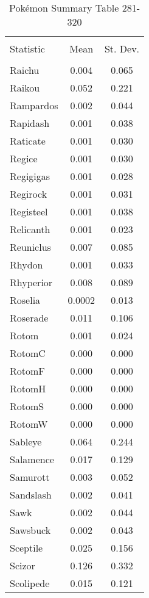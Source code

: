 \documentclass[12pt,twoside]{reedthesis}
\begin{document}
  \begin{table}[!htbp] \centering 
    \caption{Pokémon Summary Table 281-320} 
    \label{} 
  \begin{tabular}{@{\extracolsep{5pt}}lcc} 
  \\[-1.8ex]\hline 
  \hline \\[-1.8ex] 
  Statistic & \multicolumn{1}{c}{Mean} & \multicolumn{1}{c}{St. Dev.} \\ 
  \hline \\[-1.8ex] 
  Raichu & 0.004 & 0.065 \\ 
  Raikou & 0.052 & 0.221 \\ 
  Rampardos & 0.002 & 0.044 \\ 
  Rapidash & 0.001 & 0.038 \\ 
  Raticate & 0.001 & 0.030 \\ 
  Regice & 0.001 & 0.030 \\ 
  Regigigas & 0.001 & 0.028 \\ 
  Regirock & 0.001 & 0.031 \\ 
  Registeel & 0.001 & 0.038 \\ 
  Relicanth & 0.001 & 0.023 \\ 
  Reuniclus & 0.007 & 0.085 \\ 
  Rhydon & 0.001 & 0.033 \\ 
  Rhyperior & 0.008 & 0.089 \\ 
  Roselia & 0.0002 & 0.013 \\ 
  Roserade & 0.011 & 0.106 \\ 
  Rotom & 0.001 & 0.024 \\ 
  RotomC & 0.000 & 0.000 \\ 
  RotomF & 0.000 & 0.000 \\ 
  RotomH & 0.000 & 0.000 \\ 
  RotomS & 0.000 & 0.000 \\ 
  RotomW & 0.000 & 0.000 \\ 
  Sableye & 0.064 & 0.244 \\ 
  Salamence & 0.017 & 0.129 \\ 
  Samurott & 0.003 & 0.052 \\ 
  Sandslash & 0.002 & 0.041 \\ 
  Sawk & 0.002 & 0.044 \\ 
  Sawsbuck & 0.002 & 0.043 \\ 
  Sceptile & 0.025 & 0.156 \\ 
  Scizor & 0.126 & 0.332 \\ 
  Scolipede & 0.015 & 0.121 \\ 

\end{tabular}
\end{table}
\end{document}
